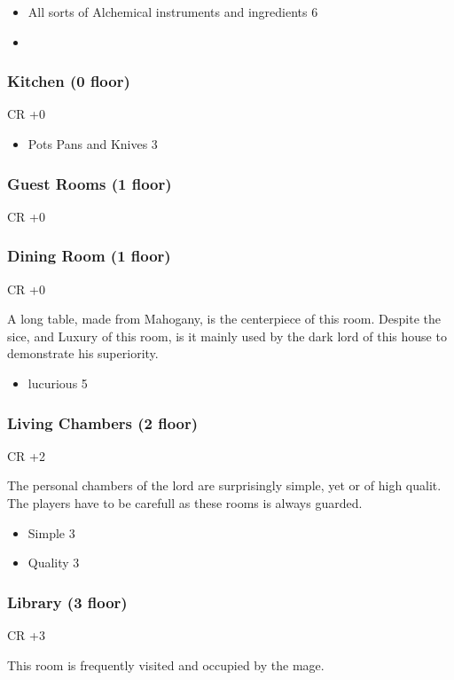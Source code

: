 \documentclass[11pt]{article}
\begin{document}
{\begin{itemize}
\item All sorts of Alchemical instruments and ingredients 6
\item 
\end{itemize}
\subsubsection{Kitchen (0 floor)}
\label{sec:orge46029f}
CR +0

\begin{itemize}
\item Pots Pans and Knives 3
\end{itemize}
\subsubsection{Guest Rooms (1 floor)}
\label{sec:org31c2261}
CR +0
\subsubsection{Dining Room (1 floor)}
\label{sec:orgd01d382}
CR +0

A long table, made from Mahogany, is the centerpiece of this room. Despite the sice, and Luxury of this room, is it mainly used by the dark lord of this house to demonstrate his superiority.

\begin{itemize}
\item lucurious 5
\end{itemize}
\subsubsection{Living Chambers (2 floor)}
\label{sec:orgcba5741}
CR +2

The personal chambers of the lord are surprisingly simple, yet or of high qualit. The players have to be carefull as these rooms is always guarded. 

\begin{itemize}
\item Simple 3
\item Quality 3
\end{itemize}
\subsubsection{Library (3 floor)}
\label{sec:org6aa93b0}
CR +3

This room is frequently visited and occupied by the mage.

}
\end{document}
